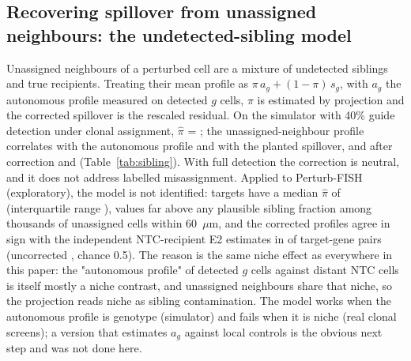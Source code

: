 \documentclass[11pt]{article}
\begin{document}
\subsection{Recovering spillover from unassigned neighbours: the undetected-sibling model}
\label{sec:sibling}
Unassigned neighbours of a perturbed cell are a mixture of undetected siblings and true
recipients. Treating their mean profile as $\pi\,a_g + (1-\pi)\,s_g$, with $a_g$ the autonomous
profile measured on detected $g$ cells, $\pi$ is estimated by projection and the corrected
spillover is the rescaled residual. On the simulator with 40\% guide detection under clonal
assignment, $\hat\pi$ = \SibPiClonalLow; the unassigned-neighbour profile correlates
\SibRUncAuto{} with the autonomous profile and \SibRUncSpill{} with the planted spillover, and
after correction \SibRCorAuto{} and \SibRCorSpill{} (Table~\ref{tab:sibling}). With full
detection the correction is neutral, and it does not address labelled misassignment. Applied to
Perturb-FISH (exploratory), the model is not identified: \SibRealNTargets{} targets have a median
$\hat\pi$ of \SibRealPiMedian{} (interquartile range \SibRealPiIqr), values far above any plausible
sibling fraction among thousands of unassigned cells within 60~$\mu$m, and the corrected
profiles agree in sign with the independent NTC-recipient E2 estimates in \SibRealAgreeCor{} of
target-gene pairs (uncorrected \SibRealAgreeUnc, chance 0.5). The reason is the same niche
effect as everywhere in this paper: the "autonomous profile" of detected $g$ cells against
distant NTC cells is itself mostly a niche contrast, and unassigned neighbours share that niche,
so the projection reads niche as sibling contamination. The model works when the autonomous
profile is genotype (simulator) and fails when it is niche (real clonal screens); a version
that estimates $a_g$ against local controls is the obvious next step and was not done here.

\begin{table}[t]
\centering
\small
\caption{Sibling model on the simulator: estimated contamination $\hat\pi$ and correlations of
the uncorrected and corrected unassigned-neighbour profiles with the planted spillover and
autonomous profiles, by scenario and guide detection rate. Source:
\texttt{paper/tables/sibling.tex}.}
\label{tab:sibling}

\end{table}
\end{document}
